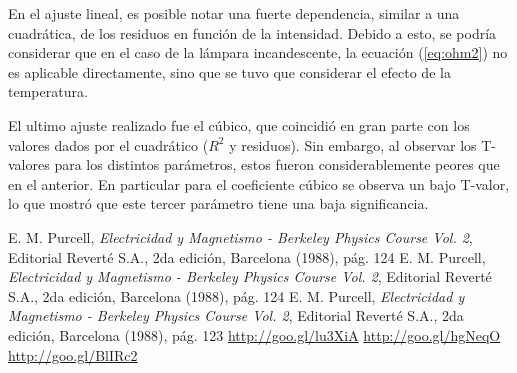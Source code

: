 \documentclass[twoside,twocolumn,a4paper]{article}
\begin{document}
En el ajuste lineal, es posible notar una fuerte dependencia, similar a una cuadr\'atica, de los residuos en funci\'on de la intensidad. Debido a esto, se podr\'ia considerar que en el caso de la l\'ampara incandescente, la ecuaci\'on (\ref{eq:ohm2}) no es aplicable directamente, sino que se tuvo que considerar el efecto de la temperatura.

El ultimo ajuste realizado fue el c\'ubico, que coincidi\'o en gran parte con los valores dados por el cuadr\'atico ($R^2$ y residuos). Sin embargo, al observar los T-valores para los distintos par\'ametros, estos fueron considerablemente peores que en el anterior. En particular para el coeficiente c\'ubico se observa un bajo T-valor, lo que mostr\'o que este tercer par\'ametro tiene una baja significancia.


\begin{thebibliography}{99} %

 E. M. Purcell, \textit{Electricidad y Magnetismo - Berkeley Physics Course Vol. 2}, Editorial Revert\'e S.A., 2da edici\'on, Barcelona (1988), p\'ag. 124
 E. M. Purcell, \textit{Electricidad y Magnetismo - Berkeley Physics Course Vol. 2}, Editorial Revert\'e S.A., 2da edici\'on, Barcelona (1988), p\'ag. 124
 E. M. Purcell, \textit{Electricidad y Magnetismo - Berkeley Physics Course Vol. 2}, Editorial Revert\'e S.A., 2da edici\'on, Barcelona (1988), p\'ag. 123
 \url{http://goo.gl/lu3XiA}
 \url{http://goo.gl/hgNeqO}
 \url{http://goo.gl/BlIRc2}
 
\end{thebibliography}

\end{document}
